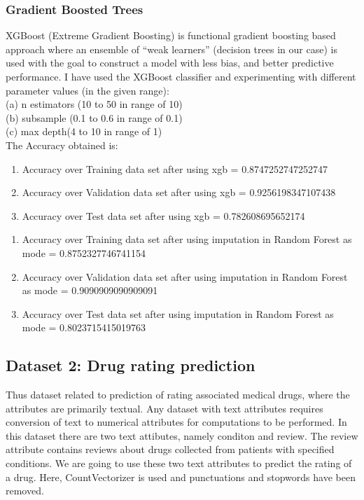 \documentclass[11pt]{article}
\begin{document}
\subsubsection{ Gradient Boosted Trees}
XGBoost (Extreme Gradient Boosting) is functional gradient
boosting based approach where an ensemble of “weak learners” (decision trees in our case) is used with the goal to construct a model with less bias, and better predictive performance. I have used the XGBoost classifier
and experimenting with different parameter values (in the given range): \\ (a) n estimators (10 to 50
in range of 10) \\ (b) subsample (0.1 to 0.6 in range of 0.1) \\ (c) max depth(4 to 10 in range of 1) \\
The Accuracy obtained is:
\begin{enumerate}
\item Accuracy over Training data set after using xgb = 0.8747252747252747
\item Accuracy over Validation data set after using xgb = 0.9256198347107438
\item Accuracy over Test data set after using xgb = 0.782608695652174
\end{enumerate}
\begin{enumerate}
\item Accuracy over Training data set after using imputation in Random Forest as mode = 0.8752327746741154
\item Accuracy over Validation data set after using imputation in Random Forest as mode = 0.9090909090909091
\item Accuracy over Test data set after using imputation in Random Forest as mode = 0.8023715415019763
\end{enumerate}

\subsection{Dataset 2: Drug rating prediction}
Thus dataset related to prediction of rating associated medical
drugs, where the attributes are primarily textual. Any dataset with text attributes requires conversion of text to numerical attributes for computations to be performed. In this dataset there are two text attibutes, namely conditon and review. The review attribute contains reviews about drugs collected from patients with specified conditions. We are going to use these two text attributes to predict the rating of a drug. Here, CountVectorizer is used and punctuations and stopwords have been removed.
\end{document}
